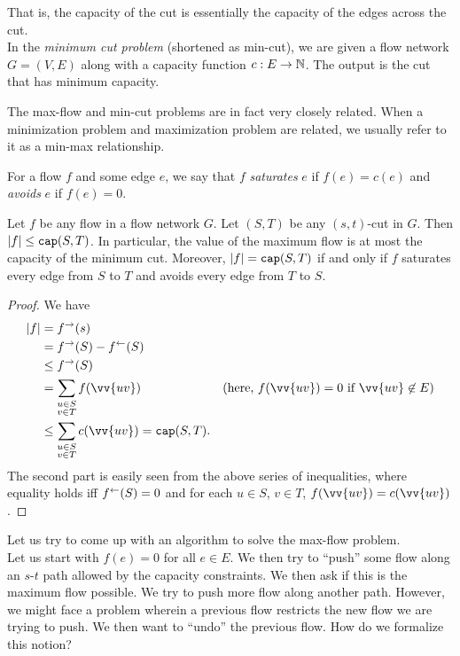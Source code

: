	That is, the capacity of the cut is essentially the capacity of the edges across the cut.\\
	In the \textit{minimum cut problem} (shortened as min-cut), we are given a flow network $G=(V,E)$ along with a capacity function $c:E\to\mathbb{N}$. The output is the cut that has minimum capacity.

	The max-flow and min-cut problems are in fact very closely related. When a minimization problem and maximization problem are related, we usually refer to it as a min-max relationship.

	For a flow $f$ and some edge $e$, we say that $f$ \textit{saturates} $e$ if $f(e)=c(e)$ and \textit{avoids} $e$ if $f(e)=0$.

	\begin{lemma}
		\label{ff-algo lemma 1}
		Let $f$ be any flow in a flow network $G$. Let $(S,T)$ be any $(s,t)$-cut in $G$. Then $|f|\leq\texttt{cap}(S,T)$. In particular, the value of the maximum flow is at most the capacity of the minimum cut. Moreover, $|f|=\texttt{cap}(S,T)$ if and only if $f$ saturates every edge from $S$ to $T$ and avoids every edge from $T$ to $S$.
	\end{lemma}
	\begin{proof}
		We have
		\begin{align*}
			|f| &= f^\to(s) \\
				&= f^\to(S) - f^\ot(S) \\
				&\leq f^\to(S) \\
				&= \sum_{\substack{u\in S \\ v\in T}} f(\vv{uv}) & (\text{here, }f(\vv{uv})=0\text{ if }\vv{uv}\not\in E) \\
				&\leq \sum_{\substack{u\in S \\ v\in T}} c(\vv{uv})  = \capp(S,T). \\
		\end{align*}
		The second part is easily seen from the above series of inequalities, where equality holds iff $f^\leftarrow(S)=0$ and for each $u\in S$, $v\in T$, $f(\vv{uv})=c(\vv{uv})$.
	\end{proof}

	Let us try to come up with an algorithm to solve the max-flow problem.\\
	Let us start with $f(e)=0$ for all $e\in E$. We then try to ``push'' some flow along an $s$-$t$ path allowed by the capacity constraints. We then ask if this is the maximum flow possible. We try to push more flow along another path. However, we might face a problem wherein a previous flow restricts the new flow we are trying to push. We then want to ``undo'' the previous flow. How do we formalize this notion?

